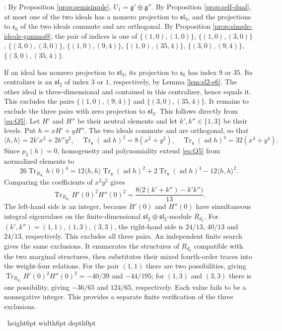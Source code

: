 \documentclass[leqno]{article}
\newcommand{\qed}{\hfill \vrule height6pt  width6pt depth0pt}
\newenvironment{proof}[1][]{\noindent {\it Proof #1} : }{\hbox{~}\qed
\smallskip
}
\numberwithin{equation}{section}
\begin{document}
\begin{proof}
By Proposition \ref{prop:semisimple}, $U_1 = \mathfrak g' \oplus \mathfrak g''$. By Proposition \ref{prop:self-dual}, at most one of the two ideals has a nonzero projection to $\mathfrak{sl}_3$, and the projections to $\mathfrak e_6$ of the two ideals commute and are orthogonal. By Proposition \ref{prop:simple-ideals-gamma0}, the pair of indices is one of $\{(1,0),(1,0)\}$, $\{(1,0),(3,0)\}$, $\{(3,0),(3,0)\}$, $\{(1,0),(9,4)\}$, $\{(1,0),(35,4)\}$, $\{(3,0),(9,4)\}$, $\{(3,0),(35,4)\}$.

If an ideal has nonzero projection to $\mathfrak{sl}_3$, its projection to $\mathfrak e_6$ has index $9$ or $35$. Its centralizer is an $\mathfrak{sl}_2$ of index $3$ or $1$, respectively, by Lemma \ref{lem:sl2-e6}. The other ideal is three-dimensional and contained in this centralizer, hence equals it. This excludes the pairs $\{(1,0),(9,4)\}$ and $\{(3,0),(35,4)\}$. It remains to exclude the three pairs with zero projection to $\mathfrak{sl}_3$. This follows directly from \eqref{eq:Q5}. Let $H'$ and $H''$ be their neutral elements and let $k',k'' \in \{1,3\}$ be their levels. Put $h = xH'+yH''$. The two ideals commute and are orthogonal, so that
\[
\langle h,h\rangle = 2k'x^2+2k''y^2,\quad
\operatorname{Tr}_{\mathfrak s}(\operatorname{ad}h)^2 = 8(x^2+y^2),\quad
\operatorname{Tr}_{\mathfrak s}(\operatorname{ad}h)^4 = 32(x^4+y^4).
\]
Since $p_2(h) = 0$, homogeneity and polynomiality extend \eqref{eq:Q5} from normalized elements to
\[
26\operatorname{Tr}_{R_{d_5}}h(0)^4
= 12\langle h,h\rangle\operatorname{Tr}_{\mathfrak s}(\operatorname{ad}h)^2
+2\operatorname{Tr}_{\mathfrak s}(\operatorname{ad}h)^4
-12\langle h,h\rangle^2.
\]
Comparing the coefficients of $x^2y^2$ gives
\begin{equation}
\label{eq:mixed-d5-exclusion}
\operatorname{Tr}_{R_{d_5}}H'(0)^2H''(0)^2
= \frac{8\big(2(k'+k'')-k'k''\big)}{13}.
\end{equation}
The left-hand side is an integer, because $H'(0)$ and $H''(0)$ have simultaneous integral eigenvalues on the finite-dimensional $\mathfrak{sl}_2 \oplus \mathfrak{sl}_2$-module $R_{d_5}$. For $(k',k'') = (1,1),(1,3),(3,3)$, the right-hand side is $24/13$, $40/13$ and $24/13$, respectively. This excludes all three pairs. An independent finite search gives the same exclusions. It enumerates the structures of $R_{d_6}$ compatible with the two marginal structures, then substitutes their mixed fourth-order traces into the weight-four relations. For the pair $(1,1)$ there are two possibilities, giving $\operatorname{Tr}_{R_{d_4}}H'(0)^2H''(0)^2 = -40/39$ and $-44/195$; for $(1,3)$ and $(3,3)$ there is one possibility, giving $-36/65$ and $124/65$, respectively. Each value fails to be a nonnegative integer. This provides a separate finite verification of the three exclusions.


\end{proof}
\end{document}
